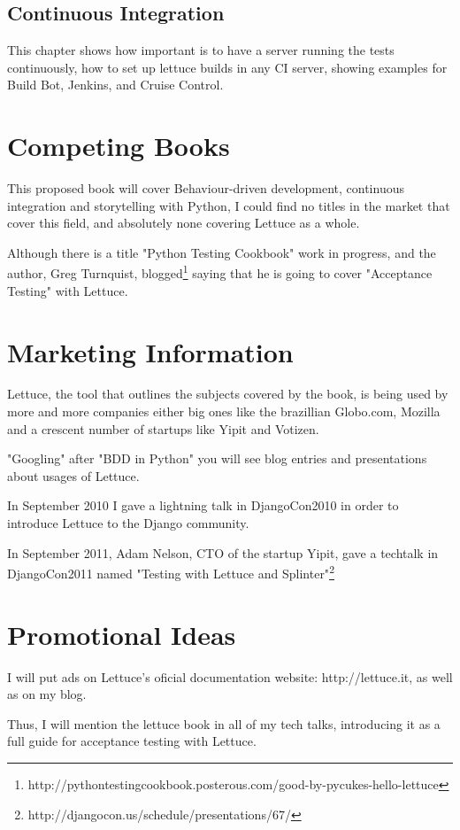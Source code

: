 \documentclass[letterpaper]{article}
\begin{document}
\subsection*{Continuous Integration}
This chapter shows how important is to have a server running the tests
continuously, how to set up lettuce builds in any CI server, showing
examples for Build Bot, Jenkins, and Cruise Control.

\section*{Competing Books }
This proposed book will cover Behaviour-driven development, continuous
integration and storytelling with Python, I could find no titles in
the market that cover this field, and absolutely none covering
Lettuce as a whole.

Although there is a title "Python Testing Cookbook" work in progress,
and the author, Greg Turnquist, blogged\footnote{http://pythontestingcookbook.posterous.com/good-by-pycukes-hello-lettuce} saying that he is going to cover
"Acceptance Testing" with Lettuce.

\section*{Marketing Information}

Lettuce, the tool that outlines the subjects covered by the book, is
being used by more and more companies either big ones like the
brazillian Globo.com, Mozilla and a crescent number of startups like
Yipit and Votizen.

"Googling" after "BDD in Python" you will see blog entries and
presentations about usages of Lettuce.

In September 2010 I gave a lightning talk in DjangoCon2010 in order to
introduce Lettuce to the Django community.

In September 2011, Adam Nelson, CTO of the startup Yipit, gave a
techtalk in DjangoCon2011 named "Testing with Lettuce and
Splinter"\footnote{http://djangocon.us/schedule/presentations/67/}

\section*{Promotional Ideas}

I will put ads on Lettuce's oficial documentation website:
http://lettuce.it, as well as on my blog.

Thus, I will mention the lettuce book in all of my tech talks,
introducing it as a full guide for acceptance testing with Lettuce.
\end{document}

